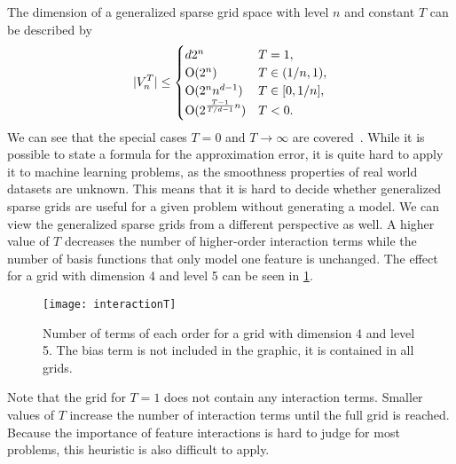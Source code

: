 The dimension of a generalized sparse grid space with level \(n\) and constant \(T\) can be described by
\begin{equation*}
  \vert V^T_n \vert \leq
  \begin{cases}
    d 2^n & T = 1, \\
    \operatorname{O}(2^n) & T \in (1/n, 1),\\
    \operatorname{O}(2^n n^{d-1}) & T \in [0, 1/n],\\
    \operatorname{O}(2^{\frac{T - 1}{T/d - 1} n}) & T < 0.
  \end{cases}
\end{equation*}
We can see that the special cases \(T = 0\) and \(T \to \infty\) are covered~\cite{optimizedApproxSpaces}.
While it is possible to state a formula for the approximation error, it is quite hard to
apply it to machine learning problems, as the smoothness properties of real world
datasets are unknown.
This means that it is hard to decide whether generalized sparse grids are useful for a given problem without generating a model.
We can view the generalized sparse grids from a different perspective as well.
A higher value of \(T\) decreases the number of higher-order interaction terms while the number of basis functions that only model one feature is unchanged.
The effect for a grid with dimension 4 and level 5 can be seen in \cref{fig:interaction-T}.
\begin{figure}[thb]
\texttt{[image: interactionT]}
\caption{Number of terms of each order for a grid with dimension 4 and level 5.
The bias term is not included in the graphic, it is contained in all grids.}\label{fig:interaction-T}
\end{figure}
Note that the grid for \(T = 1\) does not contain any interaction terms.
Smaller values of \(T\) increase the number of interaction terms until the full grid is reached.
Because the importance of feature interactions is hard to judge for most problems, this heuristic is also difficult to apply.

